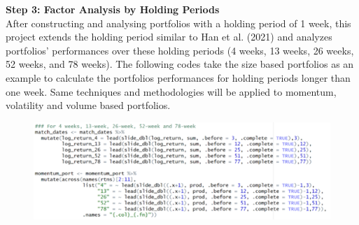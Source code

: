 \documentclass{article}
\begin{document}
\textbf{Step 3: Factor Analysis by Holding Periods}\\
After constructing and analysing portfolios with a holding period of 1 week, this project extends the holding period similar to Han et al. (2021) and analyzes portfolios' performances over these holding periods (4 weeks, 13 weeks, 26 weeks, 52 weeks, and 78 weeks).
The following codes take the size based portfolios as an example to calculate the portfolios performances for holding periods longer than one week. Same techniques and methodologies will be applied to momentum, volatility and volume based portfolios.
\begin{figure}[H]
    \centering
    \includegraphics[width=0.6\linewidth]{20.png}
    \label{fig:enter-label}
\end{figure}
\end{document}
